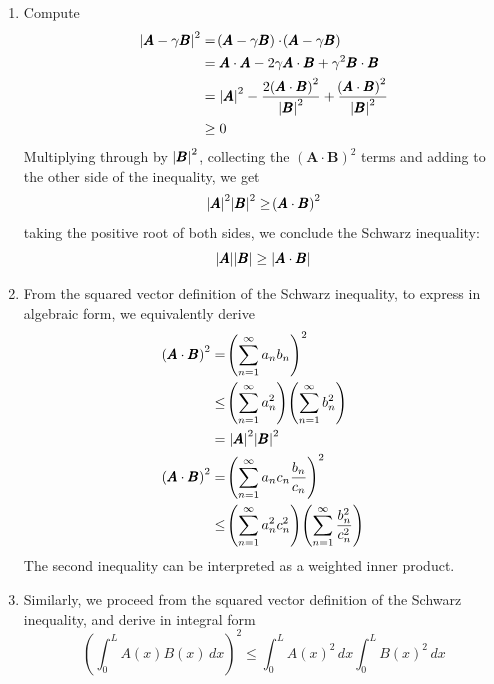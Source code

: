 \documentclass[a4paper]{article}
\begin{document}
\begin{enumerate}[label=(\alph*)]
	\item Compute
	\begin{align*}
		\abs{\pmb{A} - \gamma \pmb{B}}^{2} & = \!\left( \pmb{A} - \gamma \pmb{B} \right) \cdot \!\left( \pmb{A} - \gamma \pmb{B} \right) \\
		 & = \pmb{A} \cdot \pmb{A} - 2 \gamma \pmb{A} \cdot \pmb{B} + \gamma^{2} \pmb{B} \cdot \pmb{B} \\ 
		 & = \abs{\pmb{A}}^{2} - \frac{2 \!\left( \pmb{A} \cdot \pmb{B} \right)^{2}}{\abs{\pmb{B}}^{2}} + \frac{\!\left( \pmb{A} \cdot \pmb{B} \right)^{2}}{\abs{\pmb{B}}^{2}} \\
		 & \ge 0
	\end{align*}
	Multiplying through by \( \abs{\pmb{B}}^{2} \), collecting the \( \!\left( \pmb{A} \cdot \pmb{B} \right)^{2} \) terms and adding to the other side of the inequality, we get
	\[
		\abs{\pmb{A}}^{2}\abs{\pmb{B}}^{2} \ge \!\left( \pmb{A} \cdot \pmb{B} \right)^{2}
	\]
	taking the positive root of both sides, we conclude the Schwarz inequality:
	\[
		\abs{\pmb{A}}\abs{\pmb{B}} \ge \abs{\pmb{A} \cdot \pmb{B}} 
	\]
	\item From the squared vector definition of the Schwarz inequality, to express in algebraic form, we equivalently derive
	\begin{align*}
		\!\left( \pmb{A} \cdot \pmb{B} \right)^{2} & = \!\left( \sum^{\infty}_{n=1} a_{n}b_{n} \right)^{2} \\
		 & \le \!\left( \sum^{\infty}_{n=1} a^{2}_{n} \right) \!\left( \sum^{\infty}_{n=1} b^{2}_{n} \right) \\ 
		 & = \abs{\pmb{A}}^{2}\abs{\pmb{B}}^{2} \\
		\!\left( \pmb{A} \cdot \pmb{B} \right)^{2} & = \!\left( \sum^{\infty}_{n=1} a_{n}c_{n}\frac{b_{n}}{c_{n}} \right)^{2} \\
				      & \le \!\left( \sum^{\infty}_{n=1} a^{2}_{n}c^{2}_{n} \right) \!\left( \sum^{\infty}_{n=1} \frac{b^{2}_{n}}{c^{2}_{n}} \right)
	\end{align*}
	The second inequality can be interpreted as a weighted inner product.
	\item Similarly, we proceed from the squared vector definition of the Schwarz inequality, and derive in integral form
	\[
		\!\left( \int^{L}_{0} A \!\left( x \right) B \!\left( x \right) \, dx \right)^{2} \le \int^{L}_{0} A \!\left( x \right)^{2} \, dx \int^{L}_{0} B \!\left( x \right)^{2} \, dx    
	\]
\end{enumerate}
\end{document}
